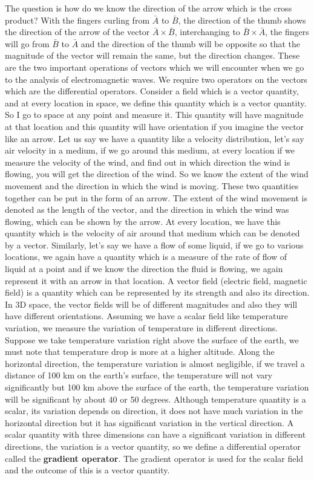The question is how do we know the direction of the arrow which is the cross product? With the fingers curling from $\bar{A}$ to $\bar{B}$, the direction of the thumb shows the direction of the arrow of the vector $\bar{A} \times \bar{B}$, interchanging to $\bar{B} \times \bar{A}$, the fingers will go from $\bar{B}$ to $\bar{A}$ and the direction of the thumb will be opposite so that the magnitude of the vector will remain the same, but the direction changes. These are the two important operations of vectors which we will encounter when we go to the analysis of electromagnetic waves. We require two operators on the vectors which are the differential operators. Consider a field which is a vector quantity, and at every location in space, we define this quantity which is a vector quantity. So I go to space at any point and measure it. This quantity will have magnitude at that location and this quantity will have orientation if you imagine the vector like an arrow. Let us say we have a quantity like a velocity distribution, let's say air velocity in a medium, if we go around this medium, at every location if we measure the velocity of the wind, and find out in which direction the wind is flowing, you will get the direction of the wind. So we know the extent of the wind movement and the direction in which the wind is moving. These two quantities together can be put in the form of an arrow. The extent of the wind movement is denoted as the length of the vector, and the direction in which the wind was flowing, which can be shown by the arrow. At every location, we have this quantity which is the velocity of air around that medium which can be denoted by a vector. Similarly, let's say we have a flow of some liquid, if we go to various locations, we again have a quantity which is a measure of the rate of flow of liquid at a point and if we know the direction the fluid is flowing, we again represent it with an arrow in that location. A vector field (electric field, magnetic field) is a quantity which can be represented by its strength and also its direction. In 3D space, the vector fields will be of different magnitudes and also they will have different orientations. Assuming we have a scalar field like temperature variation, we measure the variation of temperature in different directions. Suppose we take temperature variation right above the surface of the earth, we must note that temperature drop is more at a higher altitude. Along the horizontal direction, the temperature variation is almost negligible, if we travel a distance of 100 km on the earth's surface, the temperature will not vary significantly but 100 km above the surface of the earth, the temperature variation will be significant by about 40 or 50 degrees. Although temperature quantity is a scalar, its variation depends on direction, it does not have much variation in the horizontal direction but it has significant variation in the vertical direction. A scalar quantity with three dimensions can have a significant variation in different directions, the variation is a vector quantity, so we define a differential operator called the \textbf{gradient operator}. The gradient operator is used for the scalar field and the outcome of this is a vector quantity.

